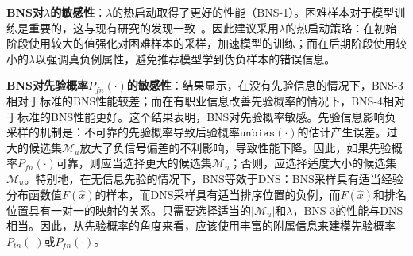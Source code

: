 \begin{table*}[h]
	\centering
	\caption{BNS负采样算法的消融实验}\label{Exp:study}
\end{table*}

\textbf{BNS对$\lambda$的敏感性}：$\lambda$的热启动取得了更好的性能（BNS-1）。困难样本对于模型训练是重要的，这与现有研究的发现一致~\cite{Ding:2020:NIPS,Park:2019:WWW}。因此建议采用$\lambda$的热启动策略：在初始阶段使用较大的值强化对困难样本的采样，加速模型的训练；而在后期阶段使用较小的$\lambda$以强调真负例属性，避免推荐模型学到伪负样本的错误信息。

\textbf{BNS对先验概率$P_{fn}(\cdot)$的敏感性}：结果显示，在没有先验信息的情况下，BNS-3相对于标准的BNS性能较差；而在有职业信息改善先验概率的情况下，BNS-4相对于标准的BNS性能更好。这个结果表明，BNS对先验概率敏感。先验信息影响负采样的机制是：不可靠的先验概率导致后验概率$\mathtt{unbias}(\cdot)$的估计产生误差。过大的候选集$\mathcal{M}_u$放大了负信号偏差的不利影响，导致性能下降。因此，如果先验概率$P_{fn}(\cdot)$可靠，则应当选择更大的候选集$\mathcal{M}_u$；否则，应选择适度大小的候选集$\mathcal{M}_u$。特别地，在无信息先验的情况下，BNS等效于DNS：BNS采样具有适当经验分布函数值$F(\hat{x})$的样本，而DNS采样具有适当排序位置的负例，而$F(\hat{x})$和排名位置具有一对一的映射的关系。只需要选择适当的$|\mathcal{M}_u|$和$\lambda$，BNS-3的性能与DNS相当。因此，从先验概率的角度来看，应该使用丰富的附属信息来建模先验概率$P_{tn}(\cdot)$或$P_{fn}(\cdot)$。

